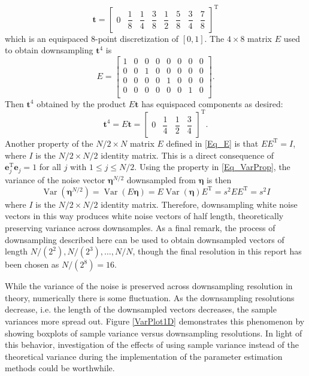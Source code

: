 \documentclass[12pt]{article}
\newcommand{\tdis}{\mathbf{t}}
\newcommand{\trans}{\mathrm{T}}	%
\newcommand{\SD}{s}	%
\newcommand{\noise}{\bm{\eta}}	%
\newcommand{\Var}{\operatorname{Var}}	%
\begin{document}
\[\tdis = \begin{bmatrix}
0 & \dfrac{1}{8} & \dfrac{1}{4} & \dfrac{3}{8} & \dfrac{1}{2} & \dfrac{5}{8} & \dfrac{3}{4} & \dfrac{7}{8}
\end{bmatrix}^{\trans}\]
which is an equispaced 8-point discretization of $[0,1]$. The $4 \times 8$ matrix $E$ used to obtain downsampling $\tdis^{4}$ is
\[E = \begin{bmatrix}
1 & 0 & 0 & 0 & 0 & 0 & 0 & 0 \\
0 & 0 & 1 & 0 & 0 & 0 & 0 & 0 \\
0 & 0 & 0 & 0 & 1 & 0 & 0 & 0 \\
0 & 0 & 0 & 0 & 0 & 0 & 1 & 0 \\
\end{bmatrix}.\]
Then $\tdis^4$ obtained by the product $E\tdis$ has equispaced components as desired:
\[\tdis^4 = E\tdis = \begin{bmatrix}
0 & \dfrac{1}{4} & \dfrac{1}{2} & \dfrac{3}{4}
\end{bmatrix}^{\trans}.\]
\indent Another property of the $N/2 \times N$ matrix $E$ defined in \eqref{Eq_E} is that $EE^{\trans} = I$, where $I$ is the $N/2 \times N/2$ identity matrix.  This is a direct consequence of $\mathbf{e}_j^\trans\mathbf{e}_j = 1$ for all $j$ with $1 \leq j \leq N/2$. Using the property in \eqref{Eq_VarProp}, the variance of the  noise vector $\noise^{N/2}$ downsampled from $\noise$ is then
\[\Var(\noise^{N/2}) = \Var(E\noise) = E\Var(\noise)E^{\trans} = \SD^2EE^{\trans} = \SD^2I\]
where $I$ is the $N/2 \times N/2$ identity matrix. Therefore, downsampling white noise vectors in this way produces white noise vectors of half length, theoretically preserving variance across downsamples. As a final remark, the process of downsampling described here can be used to obtain downsampled vectors of length $N/(2^2), N/(2^3), \ldots, N/N$, though the final resolution in this report has been chosen as $N/(2^8) = 16$. \par 
While the variance of the noise is preserved across downsampling resolution in theory, numerically there is some fluctuation. As the downsampling resolutions decrease, i.e. the length of the downsampled vectors decreases, the sample variances more spread out. Figure \ref{VarPlot1D} demonstrates this phenomenon by showing boxplots of sample variance versus downsampling resolutions. In light of this behavior, investigation of the effects of using sample variance instead of the theoretical variance during the implementation of the parameter estimation methods could be worthwhile. 
\end{document}
